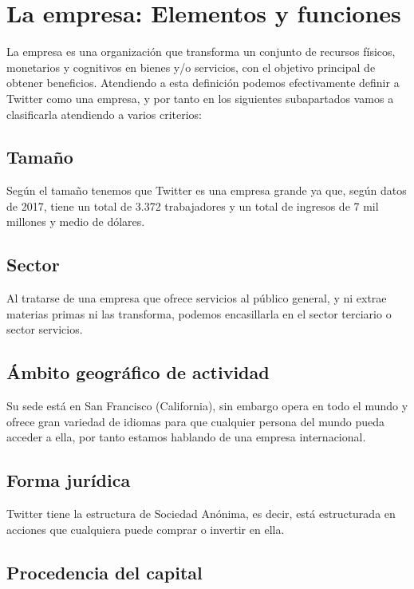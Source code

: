 \section{La empresa: Elementos y funciones}

La empresa es una organización que transforma un conjunto de recursos físicos, monetarios y cognitivos en bienes y/o servicios, con el objetivo principal de obtener beneficios.
Atendiendo a esta definición podemos efectivamente definir a Twitter como una empresa, y por tanto en los siguientes subapartados vamos a clasificarla atendiendo a varios criterios:

\subsection{Tamaño}

Según el tamaño tenemos que Twitter es una empresa grande ya que, según datos de 2017, tiene un total de 3.372 trabajadores y un total de ingresos de 7 mil millones y medio de dólares.

\subsection{Sector}

Al tratarse de una empresa que ofrece servicios al público general, y ni extrae materias primas ni las transforma, podemos encasillarla en el sector terciario o sector servicios.

\subsection{Ámbito geográfico de actividad}

Su sede está en San Francisco (California), sin embargo opera en todo el mundo y ofrece gran variedad de idiomas para que cualquier persona del mundo pueda acceder a ella, por tanto estamos hablando de una empresa internacional.

\subsection{Forma jurídica}

Twitter tiene la estructura de Sociedad Anónima, es decir, está estructurada en acciones que cualquiera puede comprar o invertir en ella.

\subsection{Procedencia del capital}

